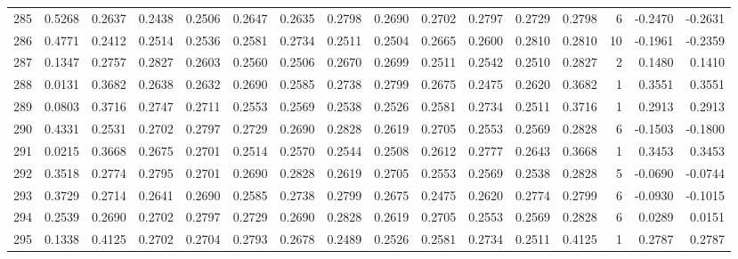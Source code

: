 \begin{tabular}{lrrrrrrrrrrrrrrr}
285 &      0.5268 &  0.2637 &  0.2438 &  0.2506 &  0.2647 &  0.2635 &  0.2798 &  0.2690 &  0.2702 &  0.2797 &   0.2729 &     0.2798 &      6 &                   -0.2470 &                    -0.2631 \\
286 &      0.4771 &  0.2412 &  0.2514 &  0.2536 &  0.2581 &  0.2734 &  0.2511 &  0.2504 &  0.2665 &  0.2600 &   0.2810 &     0.2810 &     10 &                   -0.1961 &                    -0.2359 \\
287 &      0.1347 &  0.2757 &  0.2827 &  0.2603 &  0.2560 &  0.2506 &  0.2670 &  0.2699 &  0.2511 &  0.2542 &   0.2510 &     0.2827 &      2 &                    0.1480 &                     0.1410 \\
288 &      0.0131 &  0.3682 &  0.2638 &  0.2632 &  0.2690 &  0.2585 &  0.2738 &  0.2799 &  0.2675 &  0.2475 &   0.2620 &     0.3682 &      1 &                    0.3551 &                     0.3551 \\
289 &      0.0803 &  0.3716 &  0.2747 &  0.2711 &  0.2553 &  0.2569 &  0.2538 &  0.2526 &  0.2581 &  0.2734 &   0.2511 &     0.3716 &      1 &                    0.2913 &                     0.2913 \\
290 &      0.4331 &  0.2531 &  0.2702 &  0.2797 &  0.2729 &  0.2690 &  0.2828 &  0.2619 &  0.2705 &  0.2553 &   0.2569 &     0.2828 &      6 &                   -0.1503 &                    -0.1800 \\
291 &      0.0215 &  0.3668 &  0.2675 &  0.2701 &  0.2514 &  0.2570 &  0.2544 &  0.2508 &  0.2612 &  0.2777 &   0.2643 &     0.3668 &      1 &                    0.3453 &                     0.3453 \\
292 &      0.3518 &  0.2774 &  0.2795 &  0.2701 &  0.2690 &  0.2828 &  0.2619 &  0.2705 &  0.2553 &  0.2569 &   0.2538 &     0.2828 &      5 &                   -0.0690 &                    -0.0744 \\
293 &      0.3729 &  0.2714 &  0.2641 &  0.2690 &  0.2585 &  0.2738 &  0.2799 &  0.2675 &  0.2475 &  0.2620 &   0.2774 &     0.2799 &      6 &                   -0.0930 &                    -0.1015 \\
294 &      0.2539 &  0.2690 &  0.2702 &  0.2797 &  0.2729 &  0.2690 &  0.2828 &  0.2619 &  0.2705 &  0.2553 &   0.2569 &     0.2828 &      6 &                    0.0289 &                     0.0151 \\
295 &      0.1338 &  0.4125 &  0.2702 &  0.2704 &  0.2793 &  0.2678 &  0.2489 &  0.2526 &  0.2581 &  0.2734 &   0.2511 &     0.4125 &      1 &                    0.2787 &                     0.2787 \\

\end{tabular}
